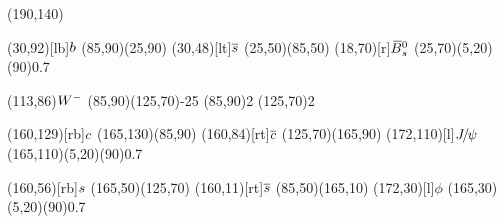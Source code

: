 \documentclass{standalone}
\begin{document}
\begin{axopicture}(190,140)

  \Text(30,92)[lb]{${b}$}       %
  \Line[arrow](85,90)(25,90)        %
  \Text(30,48)[lt]{${\overline {{s}}}$}    %
  \Line[arrow](25,50)(85,50)        %
  \Text(18,70)[r]{${{\kern 0.18em\overline{\kern -0.18em B}}{}^0_{s}}$}           %
  \GOval(25,70)(5,20)(90){0.7}      %
                                    
  \Text(113,86){\small{${W^-}$}}      %
  \Photon(85,90)(125,70){-2}{5}     %
  \Vertex(85,90){2}                 %
  \Vertex(125,70){2}                %
                                    
  \Text(160,129)[rb]{${c}$}     %
  \Line[arrow](165,130)(85,90)      %
  \Text(160,84)[rt]{${\overline {{c}}}$}   %
  \Line[arrow](125,70)(165,90)      %
  \Text(172,110)[l]{${{J\mskip -3mu/\mskip -2mu\psi}}$}        %
  \GOval(165,110)(5,20)(90){0.7}    %
                                    
  \Text(160,56)[rb]{${s}$}      %
  \Line[arrow](165,50)(125,70)      %
  \Text(160,11)[rt]{${\overline {{s}}}$}   %
  \Line[arrow](85,50)(165,10)       %
  \Text(172,30)[l]{$\phi$}          %
  \GOval(165,30)(5,20)(90){0.7}     %
                                    
\end{axopicture}
\end{document}
